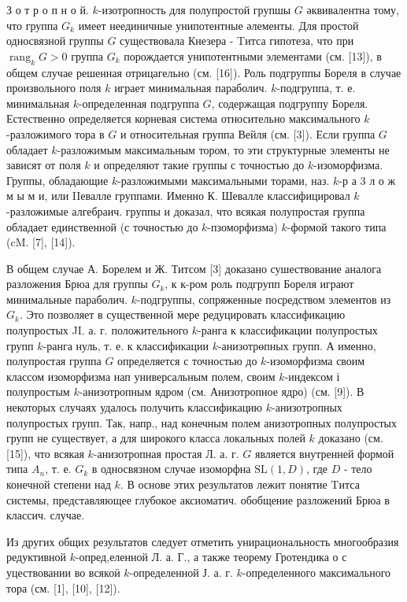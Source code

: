 \documentclass[10pt]{article}
\begin{document}
З о т р о п н о й. $k$-изотропность для полупростой групшы $G$ әквивалентна тому, что группа $G_{k}$ имеет неединичные унипотентные әлементы. Для простой односвязной группы $G$ существовала Кнезера - Tитса гипотеза, что при $\operatorname{rang}_{k} G>0$ группа $G_{k}$ порождается унипотентными элементами (см. [13]), в общем случае решенная отрицагельно (см. [16]). Роль подгруппы Бореля в случае произвольного поля $k$ играет минимальная параболич. $k$-подгруппа, т. е. минимальная $k$-определенная подгруппа $G$, содержащая подгруппу Бореля. Естественно определяется корневая система относительно максимального $k$-разложимого тора в $G$ и относительная группа Вейля (см. [3]). Если группа $G$ обладает $k$-разложимым максимальным тором, то эти структурные элементы не зависят от поля $k$ и определяют такие группы с точностью до $k$-изоморфизма. Группы, обладающие $k$-разложимыми максимальными торами, наз. $k$-р а 3 л о ж м ы м и, или IIевалле группами. Именно К. Шевалле классифицировал $k$-разложимые алгебраич. группы и доказал, что всякая полупростая группа обладает единственной (с точностью до $k$-пзоморфизма) $k$-формой такого типа (cM. [7], [14]).



В общем случае А. Борелем и Ж. Титсом [3] доказано сушествование аналога разложения Брюа для группы $G_{k}$, к к-ром роль подгрупп Бореля играют минимальные параболич. $k$-подгруппы, сопряженные посредством элементов из $G_{k}$. Это позволяет в существенной мере редуцировать классификацию полупростых JI. а. г. положительного $k$-ранга к классификации полупростых групп $k$-ранга нуль, т. е. к классификации $k$-анизотрөпных групп. А именно, полупростая группа $G$ определяется с точностью до $k$-изоморфизма своим классом изоморфизма нап универсальным полем, своим $k$-индексом і полупростым $k$-анизотропным ядром (см. Анизотропное ядро) (см. [9]). В некоторых случаях удалось получить классификацию $k$-анизотропных полупростых групп. Так, напр., над конечным полем анизотропных полупростых групп не существует, а для широкого класса локальных полей $k$ доказано (см. [15]), что всякая $k$-анизотропная простая Л. а. г. $G$ является внутренней формой типа $A_{n}$, т. е. $G_{k}$ в односвязном случае изоморфна $\mathrm{SL}(1, D)$, где $D$ - тело конечной степени над $k$. В основе этих результатов лежит понятие Tитса системы, представляющее глубокое аксиоматич. обобщение разложений Брюа в классич. случае.



Из других общих результатов следует отметить унирациональность многообразия редуктивной $k$-опред,еленной Л. а. Г., а также теорему Гротендика о с уцествовании во всякоӥ $k$-определенной $Ј$. а. г. $k$-определенного максимального тора (см. [1], [10], [12]).
\end{document}
